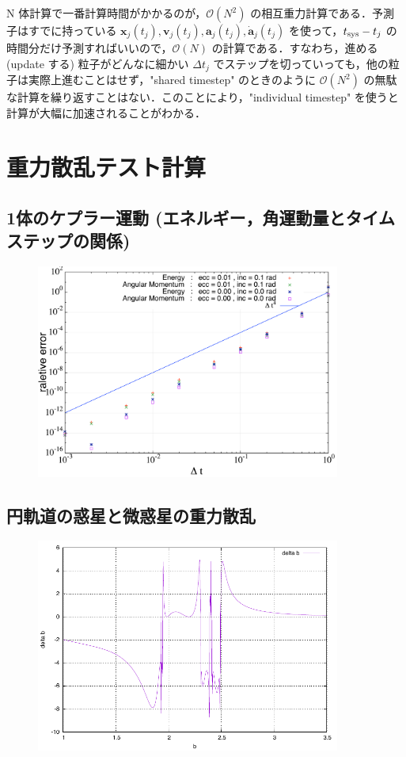 \documentclass[11pt,a4paper,oneside,onecolumn]{jarticle}
\begin{document}
N 体計算で一番計算時間がかかるのが，$\mathcal{O} (N^2)$ の相互重力計算である．予測子はすでに持っている ${\bm x}_j (t_j), {\bm v}_j (t_j), {\bm a}_j (t_j), \dot{{\bm a}}_j (t_j)$ を使って，$t_{{\rm sys}} - t_j$ の時間分だけ予測すればいいので，$\mathcal{O} (N)$ の計算である．すなわち，進める (update する) 粒子がどんなに細かい $\Delta t_j$ でステップを切っていっても，他の粒子は実際上進むことはせず，"shared timestep" のときのように $\mathcal{O} (N^2)$ の無駄な計算を繰り返すことはない．このことにより，"individual timestep" を使うと計算が大幅に加速されることがわかる．

\section{重力散乱テスト計算}
\subsection{1体のケプラー運動 (エネルギー，角運動量とタイムステップの関係)}

\begin{figure}[H]
\centering
\includegraphics[width=10cm]{./image/raletive_error.pdf}
\caption{\label{}}
\end{figure}

\subsection{円軌道の惑星と微惑星の重力散乱}

\begin{figure}[H]
\centering
\includegraphics[width=10cm]{./image/protoplanet_delta_b.pdf}
\caption{\label{}}
\end{figure}
\end{document}
